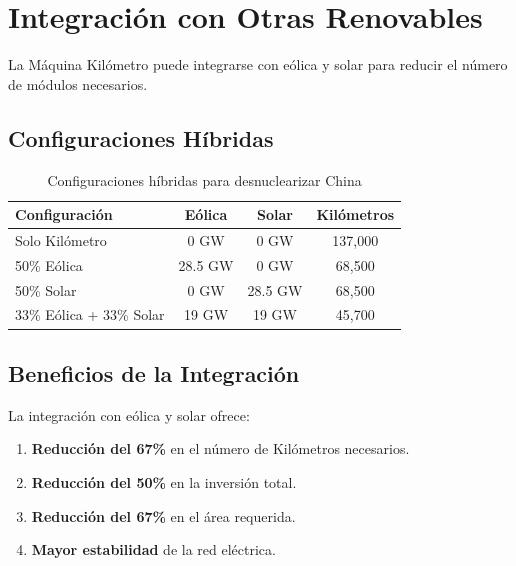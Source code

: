 \documentclass[12pt,a4paper]{article}
\begin{document}
\section{Integración con Otras Renovables}

La Máquina Kilómetro puede integrarse con eólica y solar para reducir el número de módulos necesarios.

\subsection{Configuraciones Híbridas}

\begin{table}[H]
\centering
\caption{Configuraciones híbridas para desnuclearizar China}
\label{tab:hibridas}
\begin{tabular}{@{}lccc@{}}
\toprule
\textbf{Configuración} & \textbf{Eólica} & \textbf{Solar} & \textbf{Kilómetros} \\
\midrule
Solo Kilómetro & 0 GW & 0 GW & 137,000 \\
50\% Eólica & 28.5 GW & 0 GW & 68,500 \\
50\% Solar & 0 GW & 28.5 GW & 68,500 \\
33\% Eólica + 33\% Solar & 19 GW & 19 GW & 45,700 \\
\bottomrule
\end{tabular}
\end{table}

\subsection{Beneficios de la Integración}

La integración con eólica y solar ofrece:

\begin{enumerate}
    \item \textbf{Reducción del 67\%} en el número de Kilómetros necesarios.
    \item \textbf{Reducción del 50\%} en la inversión total.
    \item \textbf{Reducción del 67\%} en el área requerida.
    \item \textbf{Mayor estabilidad} de la red eléctrica.
\end{enumerate}

\end{document}
